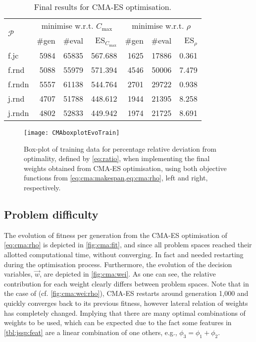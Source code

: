 \begin{table}\centering
\caption{Final results for CMA-ES optimisation.}\label{cma:funeval}
\begin{tabular}{l |rrr |rrr}\toprule
\multirow{2}{*}{$\mathcal{P}$}
& \multicolumn{3}{c|}{minimise w.r.t. $C_{\max}$}& \multicolumn{3}{c}{minimise w.r.t. $\rho$} \\
 & \#gen & \#eval & ES$_{C_{\max}}$ & \#gen & \#eval & ES$_\rho$ \\
\midrule
f.jc & 5984 & 65835 & 567.688  & 1625 & 17886 & 0.361 \\
f.rnd & 5088 & 55979 & 571.394 & 4546 & 50006 & 7.479 \\
f.rndn & 5557 & 61138 & 544.764 & 2701 & 29722 & 0.938 \\
j.rnd & 4707 & 51788 & 448.612 & 1944 & 21395 & 8.258 \\
j.rndn & 4802 & 52833 & 449.942 & 1974 & 21725 & 8.691 \\
\bottomrule
\end{tabular}
\end{table}

\begin{figure}
\texttt{[image: CMAboxplotEvoTrain]}
\caption{Box-plot of training data for percentage relative deviation from optimality, defined by \cref{eq:ratio}, when implementing the final weights obtained from CMA-ES optimisation, using both objective functions from \cref{eq:cma:makespan,eq:cma:rho}, left and right, respectively.}\label{fig:cma:trainboxpl}
\end{figure}

\subsection{Problem difficulty}\label{sec:expr:data}
The evolution of fitness per generation from the CMA-ES optimisation of \cref{eq:cma:rho} is depicted in \cref{fig:cma:fit}, and since all problem spaces reached their allotted computational time, without converging. In fact  and  needed restarting during the optimisation process. 
Furthermore, the  evolution of the decision variables, $\vec{w}$, are depicted in \cref{fig:cma:wei}. As one can see, the relative contribution for each weight clearly differs between problem spaces. Note that in the case of  (cf. \cref{fig:cma:wei:rho}), CMA-ES restarts around generation 1,000 and quickly converges back to its previous fitness, however lateral relation of weights has completely changed. Implying that there are many optimal combinations of weights to be used, which can be expected due  to the fact some features in \cref{tbl:jssp:feat} are a linear combination of one others, e.g., $\phi_3=\phi_1+\phi_2$.

